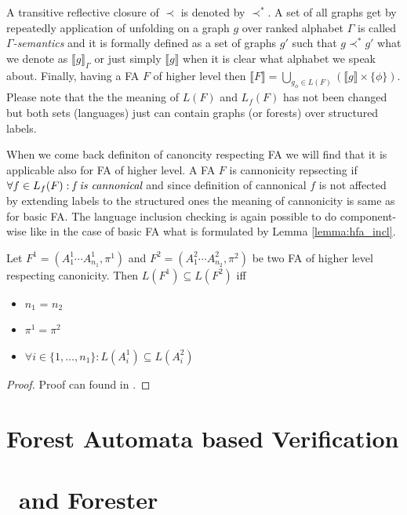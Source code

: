 A transitive reflective closure of $\prec$ is denoted by $\prec^*$.
A set of all graphs get by repeatedly application of unfolding on a graph $g$ over ranked alphabet $\Gamma$ is called
\emph{$\Gamma$-semantics} and it is formally defined as a set of graphs $g'$ such that $g \prec^* g'$
what we denote as $\llbracket g \rrbracket_\Gamma$ or just simply $\llbracket g \rrbracket$ when it is
clear what alphabet we speak about.
Finally, having a FA $F$ of higher level then $\llbracket F \rrbracket = \bigcup_{g_\phi \in L(F)} (\llbracket g \rrbracket \times \{\phi\})$.
Please note that the the meaning of $L(F)$ and $L_f(F)$ has not been changed but both sets (languages) just can contain graphs (or forests)
over structured labels.

When we come back definiton of canoncity respecting FA we will find that it is applicable also for FA of higher level.
A FA $F$ is cannonicity repsecting if $\forall f \in L_f(F): \emph{f is cannonical}$ and since definition of cannonical $f$
is not affected by extending labels to the structured ones the meaning of cannonicity is same as for basic FA.
The language inclusion checking is again possible to do component-wise like in the case of basic FA what is
formulated by Lemma \ref{lemma:hfa_incl}.

\begin{lemma}
	Let $F^1 = (A_1^1\cdots A_{n_1}^1, \pi^1)$ and $F^2 = (A_1^2\cdots A_{n_2}^2, \pi^2)$
	be two FA of higher level respecting canonicity.
	Then $L(F^1) \subseteq L(F^2)$ iff
	\begin{itemize}
			\item $n_1$ = $n_2$
			\item $\pi^1 = \pi^2$
			\item $\forall i \in \{1,\ldots,n_1\}: L(A_i^1) \subseteq L(A_i^2)$
	\end{itemize}
\end{lemma}
\begin{proof}
	Proof can found in \cite{cav11tr}.
\end{proof}


\chapter{Forest Automata based Verification}
\label{ch:fav}

\chapter{\vata\ and Forester}
\label{ch:tools}

